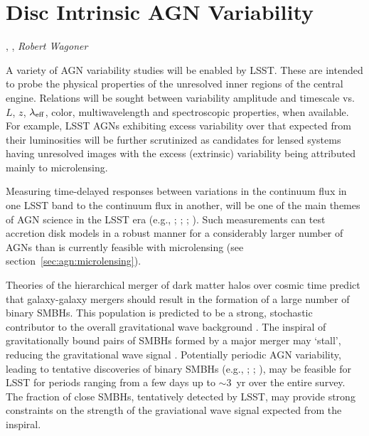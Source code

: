 %
%

\section{Disc Intrinsic AGN Variability}
\def\secname{\chpname:variability}\label{sec:\secname}

,
,
{\it Robert Wagoner}

A variety of AGN variability studies will be enabled by LSST. These are
intended to probe the physical properties of the unresolved inner regions
of the central engine. Relations will be sought between variability amplitude
and timescale vs. $L$, $z$, $\lambda_{\rm eff}$, color, multiwavelength and
spectroscopic properties, when available. For example, LSST AGNs exhibiting excess
variability over that expected from their luminosities will be further scrutinized
as candidates for lensed systems having unresolved images with the excess
(extrinsic) variability being attributed mainly to microlensing.

Measuring time-delayed responses between variations in the continuum flux in one
LSST band to the continuum flux in another, will be one of the main themes of
AGN science in the LSST era (e.g., \citealt{Chelouche2013};
\citealt{CheloucheandZucker2013}; \citealt{EdelsonEtal2015};
\citealt{FausnaughEtal2015}). Such measurements can test accretion disk models
in a robust manner for a considerably larger number of AGNs than is currently
feasible with microlensing (see section~\ref{sec:agn:microlensing}).

Theories of the hierarchical merger of dark matter halos over cosmic time
predict that galaxy-galaxy mergers should result in the formation of a large
number of binary SMBHs. This population is predicted to be a strong, stochastic
contributor to the overall gravitational wave background
\citep{2015arXiv151105564T}. The inspiral of gravitationally bound pairs of
SMBHs formed by a major merger may `stall', reducing the gravitational wave
signal \citep{2014SSRv..183..189C}. Potentially periodic AGN variability,
leading to tentative discoveries of binary SMBHs (e.g.,
\citealt{2015Natur.525..351D}; \citealt{GrahamEtal2015}; \citealt{LiuEtal2015}),
may be feasible for LSST for periods ranging from a few days up to $\sim3$~yr
over the entire survey. The fraction of close SMBHs, tentatively detected by
LSST, may provide strong constraints on the strength of the graviational wave
signal expected from the inspiral.


